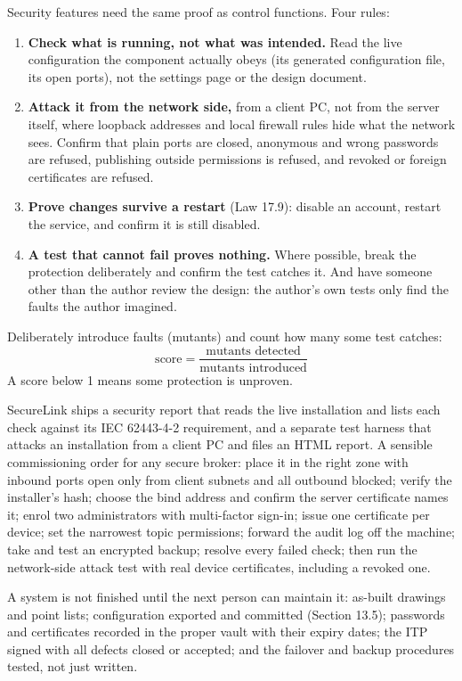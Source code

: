 Security features need the same proof as control functions. Four rules:
\begin{enumerate}
\item \textbf{Check what is running, not what was intended.} Read the live configuration the component actually obeys (its generated configuration file, its open ports), not the settings page or the design document.
\item \textbf{Attack it from the network side,} from a client PC, not from the server itself, where loopback addresses and local firewall rules hide what the network sees. Confirm that plain ports are closed, anonymous and wrong passwords are refused, publishing outside permissions is refused, and revoked or foreign certificates are refused.
\item \textbf{Prove changes survive a restart} (Law 17.9): disable an account, restart the service, and confirm it is still disabled.
\item \textbf{A test that cannot fail proves nothing.} Where possible, break the protection deliberately and confirm the test catches it. And have someone other than the author review the design: the author's own tests only find the faults the author imagined.
\end{enumerate}
 Deliberately introduce faults (mutants) and count how many some test catches:
\[ \text{score} = \frac{\text{mutants detected}}{\text{mutants introduced}} \]
A score below 1 means some protection is unproven.

 SecureLink ships a security report that reads the live installation and lists each check against its IEC 62443-4-2 requirement, and a separate test harness that attacks an installation from a client PC and files an HTML report. A sensible commissioning order for any secure broker: place it in the right zone with inbound ports open only from client subnets and all outbound blocked; verify the installer's hash; choose the bind address and confirm the server certificate names it; enrol two administrators with multi-factor sign-in; issue one certificate per device; set the narrowest topic permissions; forward the audit log off the machine; take and test an encrypted backup; resolve every failed check; then run the network-side attack test with real device certificates, including a revoked one.

A system is not finished until the next person can maintain it: as-built drawings and point lists; configuration exported and committed (Section 13.5); passwords and certificates recorded in the proper vault with their expiry dates; the ITP signed with all defects closed or accepted; and the failover and backup procedures tested, not just written.


